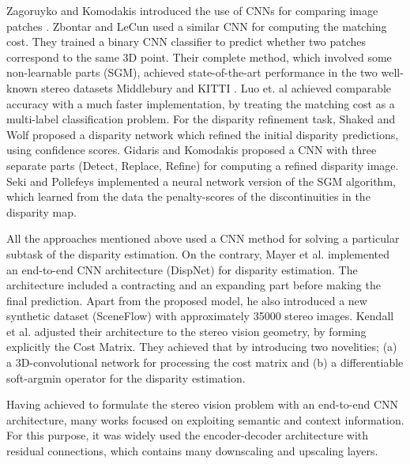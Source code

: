 \documentclass[runningheads]{llncs}
\begin{document}
Zagoruyko and Komodakis introduced the use of CNNs for comparing image patches \cite{zagoruyko2015learning}. Zbontar and LeCun \cite{Zbontar_2015_CVPR} used a similar CNN for computing the matching cost. They trained a binary CNN classifier to predict whether two patches correspond to the same 3D point. Their complete method, which involved some non-learnable parts (SGM), achieved state-of-the-art performance in the two well-known stereo datasets Middlebury \cite{Scharstein2014} and KITTI \cite{Menze2015ISA}. Luo et. al \cite{luo2016efficient} achieved comparable accuracy with a much faster implementation, by treating the matching cost as a multi-label classification problem. For the disparity refinement task, Shaked and Wolf \cite{shaked2017improved} proposed a disparity network which refined the initial disparity predictions, using confidence scores. Gidaris and Komodakis \cite{Gidaris2017DetectLabeling} proposed a CNN with three separate parts (Detect, Replace, Refine) for computing a refined disparity image. Seki and Pollefeys implemented a neural network version of the SGM algorithm, which learned from the data the penalty-scores of the discontinuities in the disparity map. 

All the approaches mentioned above used a CNN method for solving a particular subtask of the disparity estimation. On the contrary, Mayer et al. \cite{Mayer2016ALD} implemented an end-to-end CNN architecture (DispNet) for disparity estimation. The architecture included a contracting and an expanding part before making the final prediction. Apart from the proposed model, he also introduced a new synthetic dataset (SceneFlow) with approximately 35000 stereo images. Kendall et al. \cite{Kendall2017End-to-EndRegression} adjusted their architecture to the stereo vision geometry, by forming explicitly the Cost Matrix. They achieved that by introducing two novelities; (a) a 3D-convolutional network for processing the cost matrix and (b) a differentiable soft-argmin operator for the disparity estimation. 

Having achieved to formulate the stereo vision problem with an end-to-end CNN architecture, many works focused on exploiting semantic and context information. For this purpose, it was widely used the encoder-decoder architecture with residual connections, which contains many downscaling and upscaling layers.
\end{document}
